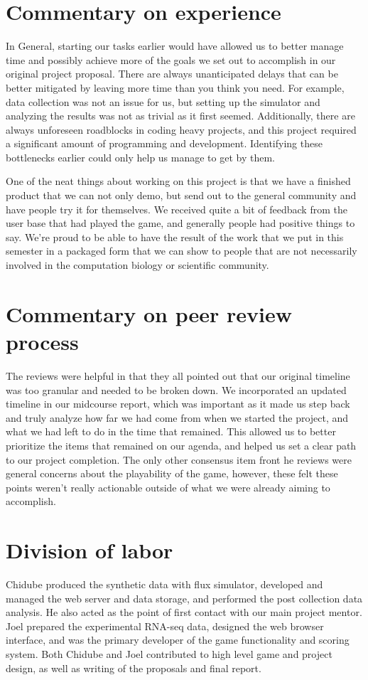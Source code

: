\documentclass[12pt]{article}
\begin{document}
\section*{Commentary on experience}

In General, starting our tasks earlier would have allowed us to better manage time and possibly achieve more of the goals we set out to accomplish in our original project proposal.
There are always unanticipated delays that can be better mitigated by leaving more time than you think you need. For example, data collection was not an issue for us, but
setting up the simulator and analyzing the results was not as trivial as it first seemed. Additionally, there are always unforeseen roadblocks in coding heavy projects, and this project
required a significant amount of programming and development. Identifying these bottlenecks earlier could only help us manage to get by them.

One of the neat things about working on this project is that we have a finished product that we can not only demo, but send out to the general community and have people try it for themselves.
We received quite a bit of feedback from the user base that had played the game, and generally people had positive things to say. We're proud to be able to have the result of the work
that we put in this semester in a packaged form that we can show to people that are not necessarily involved in the computation biology or scientific community.

\section*{Commentary on peer review process}

The reviews were helpful in that they all pointed out that our original timeline was too granular and needed to be broken down. We incorporated an updated timeline in our midcourse
report, which was important as it made us step back and truly analyze how far we had come from when we started the project, and what we had left to do in the time that remained. This
allowed us to better prioritize the items that remained on our agenda, and helped us set a clear path to our project completion. The only other consensus item front he reviews were general
concerns about the playability of the game, however, these felt these points weren't really actionable outside of what we were already aiming to accomplish.

\section*{Division of labor}

Chidube produced the synthetic data with flux simulator, developed and managed the web server and data storage, and performed the post collection data analysis. He also acted as the point
 of first contact with our main project mentor. Joel prepared the experimental RNA-seq data, designed the web browser interface, and was the primary developer of the game functionality and 
 scoring system. Both Chidube and Joel contributed to high level game and project design, as well as writing of the proposals and final report.


\end{document}
